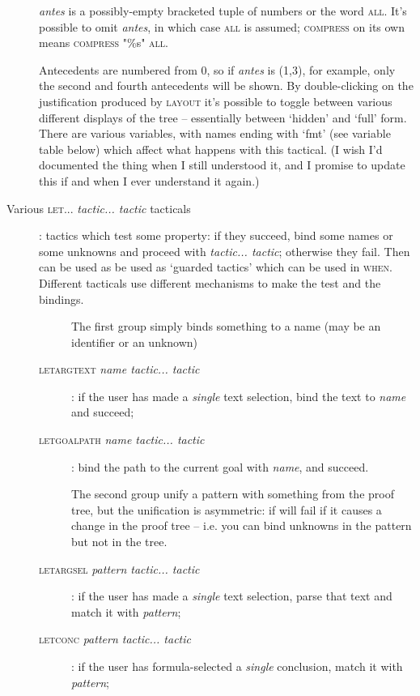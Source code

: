 \begin{description}
\textit{antes} is a possibly-empty bracketed tuple of numbers or the word \textsc{all}. It's possible to omit \textit{antes}, in which case \textsc{all} is assumed; \textsc{compress} on its own means \textsc{compress} "\%s" \textsc{all}.

Antecedents are numbered from 0, so if \textit{antes} is (1,3), for example, only the second and fourth antecedents will be shown. By double-clicking on the justification produced by \textsc{layout} it's possible to toggle between various different displays of the tree -- essentially between `hidden' and `full' form. There are various variables, with names ending with `fmt' (see variable table below) which affect what happens with this tactical. (I wish I'd documented the thing when I still understood it, and I promise to update this if and when I ever understand it again.)

\item [Various \textsc{let}... \textit{tactic... tactic} tacticals]: tactics which test some property: if they succeed, bind some names or some unknowns and proceed with \textit{tactic... tactic}; otherwise they fail. Then can be used as be used as `guarded tactics' which can be used in \textsc{when}. Different tacticals use different mechanisms to make the test and the bindings. 

\begin{description}
\item [] The first group simply binds something to a name (may be an identifier or an unknown)
\item [\textsc{letargtext} \textit{name tactic... tactic}]: if the user has made a \textit{single} text selection, bind the text to \textit{name} and succeed; 
\item [\textsc{letgoalpath}  \textit{name tactic... tactic}]: bind the path to the current goal with \textit{name}, and succeed. 
\end{description}

\begin{description}
\item[] The second group unify a pattern with something from the proof tree, but the unification is asymmetric: if will fail if it causes a change in the proof tree -- i.e. you can bind unknowns in the pattern but not in the tree.

\item [\textsc{letargsel} \textit{pattern tactic... tactic}]: if the user has made a \textit{single} text selection, parse that text and match it with \textit{pattern}; 
\item [\textsc{letconc} \textit{pattern tactic... tactic}]: if the user has formula-selected a \textit{single} conclusion, match it with \textit{pattern}; 


\end{description}
\end{description}
